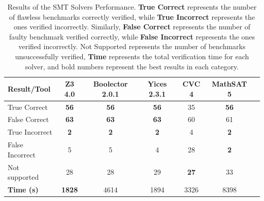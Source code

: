 \documentclass[times, doublespace]{cpeauth}
\begin{document}
\begin{table}[bh]
 \caption{Results of the SMT Solvers Performance. \textbf{True Correct} represents the number of flawless benchmarks correctly verified, while \textbf{True Incorrect} represents the ones verified incorrectly. Similarly, \textbf{False Correct} represents the number of faulty benchmark verified correctly, while \textbf{False Incorrect} represents the ones verified incorrectly. Not Supported represents the number of benchmarks unsuccessfully verified, \textbf{Time} represents the total verification time for each solver, and bold numbers represent the best results in each category.}
\centering
\label{table:solvers}
\begin{tabular}{c c c c c c c}
\hline
\multicolumn{1}{|l|}{\textbf{Result/Tool}}
& \multicolumn{1}{c|}{\textbf{Z3 4.0}} & \multicolumn{1}{c|}{\textbf{Boolector 2.0.1}} & \multicolumn{1}{c|}{\textbf{Yices 2.3.1}}
& \multicolumn{1}{c|}{\textbf{CVC 4}} & \multicolumn{1}{c|}{\textbf{MathSAT 5}} \\ \hline
\multicolumn{1}{|l|}{True Correct}
& \multicolumn{1}{c|}{\textbf{56}} & \multicolumn{1}{c|}{\textbf{56}} 
& \multicolumn{1}{c|}{\textbf{56}} & \multicolumn{1}{c|}{35} & \multicolumn{1}{c|}{\textbf{56}} \\ \hline

\multicolumn{1}{|l|}{False Correct}
& \multicolumn{1}{c|}{\textbf{63}} & \multicolumn{1}{c|}{\textbf{63}} 
& \multicolumn{1}{c|}{\textbf{63}} & \multicolumn{1}{c|}{60} & \multicolumn{1}{c|}{61} \\ \hline

\multicolumn{1}{|l|}{True Incorrect}
& \multicolumn{1}{c|}{\textbf{2}} & \multicolumn{1}{c|}{\textbf{2}} 
& \multicolumn{1}{c|}{\textbf{\textbf{2}}} & \multicolumn{1}{c|}{4} & \multicolumn{1}{c|}{\textbf{2}} \\ \hline

\multicolumn{1}{|l|}{False Incorrect}
& \multicolumn{1}{c|}{5} & \multicolumn{1}{c|}{5} 
& \multicolumn{1}{c|}{4} & \multicolumn{1}{c|}{28} & \multicolumn{1}{c|}{\textbf{2}} \\ \hline

\multicolumn{1}{|l|}{Not supported}
& \multicolumn{1}{c|}{28} & \multicolumn{1}{c|}{28} 
& \multicolumn{1}{c|}{29} & \multicolumn{1}{c|}{\textbf{27}} & \multicolumn{1}{c|}{33} \\ \hline

\multicolumn{1}{|l|}{\textbf{Time (s)}}
& \multicolumn{1}{c|}{\textbf{1828}} & \multicolumn{1}{c|}{4614} 
& \multicolumn{1}{c|}{1894} & \multicolumn{1}{c|}{3326} & \multicolumn{1}{c|}{8398} \\ \hline
\end{tabular}
\end{table}
\end{document}

